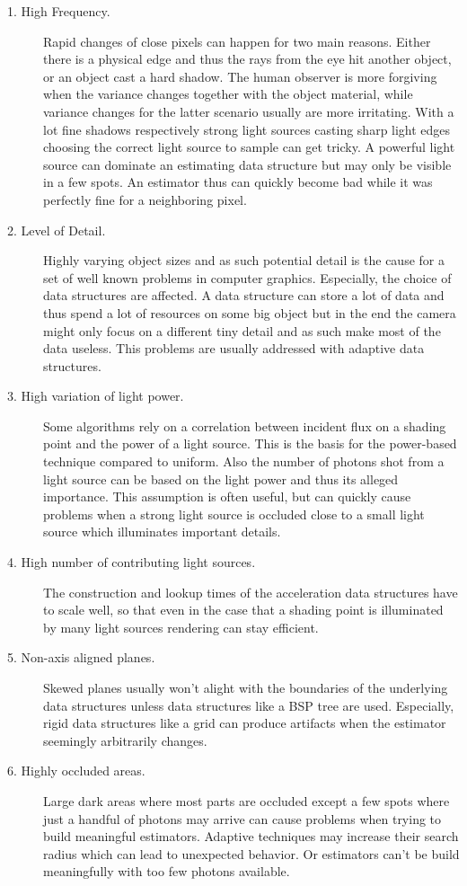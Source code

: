 \begin{description}
    \item[1. High Frequency.] Rapid changes of close pixels can happen for two main reasons. Either there is a physical edge and thus the rays from the eye hit another object, or an object cast a hard shadow. The human observer is more forgiving when the variance changes together with the object material, while variance changes for the latter scenario usually are more irritating. With a lot fine shadows respectively strong light sources casting sharp light edges choosing the correct light source to sample can get tricky. A powerful light source can dominate an estimating data structure but may only be visible in a few spots. An estimator thus can quickly become bad while it was perfectly fine for a neighboring pixel. 
    \item[2. Level of Detail.] Highly varying object sizes and as such potential detail is the cause for a set of well known problems in computer graphics. Especially, the choice of data structures are affected. A data structure can store a lot of data and thus spend a lot of resources on some big object but in the end the camera might only focus on a different tiny detail and as such make most of the data useless. This problems are usually addressed with adaptive data structures.
    \item[3. High variation of light power.] Some algorithms rely on a correlation between incident flux on a shading point and the power of a light source. This is the basis for the power-based technique compared to uniform. Also the number of photons shot from a light source can be based on the light power and thus its alleged importance. This assumption is often useful, but can quickly cause problems when a strong light source is occluded close to a small light source which illuminates important details.
    \item[4. High number of contributing light sources.] The construction and lookup times of the acceleration data structures have to scale well, so that even in the case that a shading point is illuminated by many light sources rendering can stay efficient.
    \item[5. Non-axis aligned planes.] Skewed planes usually won't alight with the boundaries of the underlying data structures unless data structures like a BSP tree are used. Especially, rigid data structures like a grid can produce artifacts when the estimator seemingly arbitrarily changes. 
    \item[6. Highly occluded areas.] Large dark areas where most parts are occluded except a few spots where just a handful of photons may arrive can cause problems when trying to build meaningful estimators. Adaptive techniques may increase their search radius which can lead to unexpected behavior. Or estimators can't be build meaningfully with too few photons available.

\end{description}

